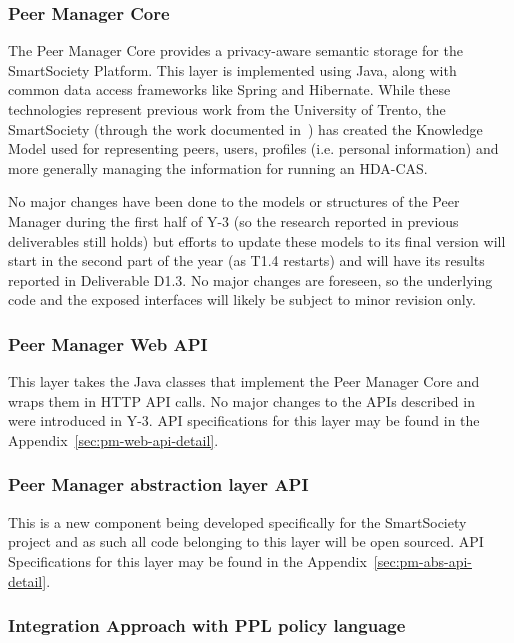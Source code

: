 \subsubsection{Peer Manager Core}
The Peer Manager Core provides a privacy-aware semantic storage for the SmartSociety Platform. This layer is implemented using Java, along with common data access frameworks like Spring and Hibernate.
While these technologies represent previous work from the University of Trento, the SmartSociety (through the work documented in~\cite{D1.1,D4.1,D4.2}) has created the Knowledge Model used for representing peers, users, profiles (i.e. personal information) and more generally managing the information for running an HDA-CAS.

No major changes have been done to the models or structures of the Peer Manager during the first half of Y-3 (so the research reported in previous deliverables still holds) but efforts to update these models to its final version will start in the second part of the year (as T1.4 restarts) and will have its results reported in Deliverable D1.3. No major changes are foreseen, so the underlying code and the exposed interfaces will likely be subject to minor revision only. 

\subsubsection{Peer Manager Web API} \label{ssec:pm-web-api}
This layer takes the Java classes that implement the Peer Manager Core and wraps them in HTTP API calls. 
No major changes to the APIs described in~\cite{D4.2} were introduced in Y-3. API specifications for this layer may be found in the Appendix~\ref{sec:pm-web-api-detail}.

\subsubsection{Peer Manager abstraction layer API} \label{ssec:pm-abs-api}
 
This is a new component being developed specifically for the SmartSociety project and as such all code belonging to this layer will be open sourced. API Specifications for this layer may be found in the Appendix~\ref{sec:pm-abs-api-detail}.

\subsubsection{Integration Approach with PPL policy language}

